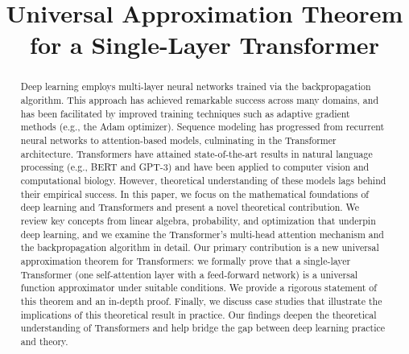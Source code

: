 \documentclass[conference]{IEEEtran}
\begin{document}
\title{Universal Approximation Theorem for a Single-Layer Transformer}

\author{
}

\maketitle

\begin{abstract}
Deep learning employs multi-layer neural networks trained via the backpropagation algorithm. This approach has achieved remarkable success across many domains, and has been facilitated by improved training techniques such as adaptive gradient methods (e.g., the Adam optimizer). Sequence modeling has progressed from recurrent neural networks to attention-based models, culminating in the Transformer architecture. Transformers have attained state-of-the-art results in natural language processing (e.g., BERT and GPT-3) and have been applied to computer vision and computational biology. However, theoretical understanding of these models lags behind their empirical success. In this paper, we focus on the mathematical foundations of deep learning and Transformers and present a novel theoretical contribution. We review key concepts from linear algebra, probability, and optimization that underpin deep learning, and we examine the Transformer's multi-head attention mechanism and the backpropagation algorithm in detail. Our primary contribution is a new universal approximation theorem for Transformers: we formally prove that a single-layer Transformer (one self-attention layer with a feed-forward network) is a universal function approximator under suitable conditions. We provide a rigorous statement of this theorem and an in-depth proof. Finally, we discuss case studies that illustrate the implications of this theoretical result in practice. Our findings deepen the theoretical understanding of Transformers and help bridge the gap between deep learning practice and theory.
\end{abstract}
\end{document}
